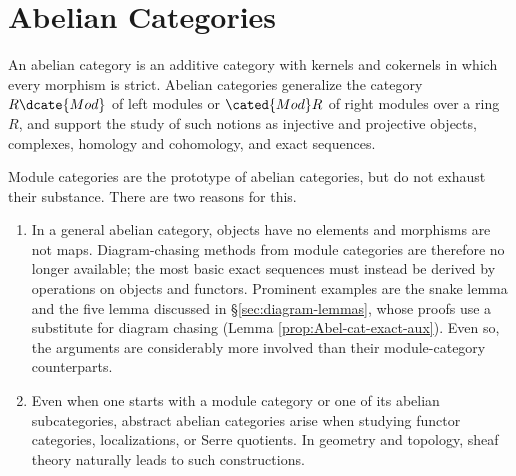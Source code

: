 
\chapter{Abelian Categories}\label{sec:Abel-cat}
\hypertarget{o014.aljabr2.chapter2.overview}{ }

An abelian category is an additive category with kernels and cokernels in
which every morphism is strict. Abelian categories generalize the category
$R\dcate{Mod}$ of left modules or $\cated{Mod}R$ of right modules over a ring
$R$, and support the study of such notions as injective and projective
objects, complexes, homology and cohomology, and exact sequences.

Module categories are the prototype of abelian categories, but do not exhaust
their substance. There are two reasons for this.
\begin{enumerate}
	\item In a general abelian category, objects have no elements and
	morphisms are not maps. Diagram-chasing methods from module categories are
	therefore no longer available; the most basic exact sequences must instead
	be derived by operations on objects and functors. Prominent examples are
	the snake lemma and the five lemma discussed in
	\S\ref{sec:diagram-lemmas}, whose proofs use a substitute for diagram
	chasing (Lemma \ref{prop:Abel-cat-exact-aux}). Even so, the arguments are
	considerably more involved than their module-category counterparts.

	\item Even when one starts with a module category or one of its abelian
	subcategories, abstract abelian categories arise when studying functor
	categories, localizations, or Serre quotients. In geometry and topology,
	sheaf theory naturally leads to such constructions.
\end{enumerate}

